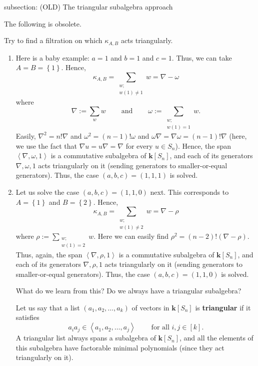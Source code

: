 \documentclass[numbers=enddot,12pt,final,onecolumn,notitlepage]{scrartcl}%
\numberwithin{exer}{subsection}
\theoremstyle{definition}
\let\sumnonlimits\sum
\renewcommand{\sum}{\sumnonlimits\limits}
\newenvironment{noncompile}{}{}
\begin{document}
\begin{noncompile}
subsection: (OLD) The triangular subalgebra approach

The following is obsolete.

Try to find a filtration on which $\kappa_{A,B}$ acts triangularly.

\begin{enumerate}
\item Here is a baby example: $a=1$ and $b=1$ and $c=1$. Thus, we can take
$A=B=\left\{  1\right\}  $. Hence,
\[
\kappa_{A,B}=\sum_{\substack{w;\\w\left(  1\right)  \neq1}}w=\nabla-\omega
\]
where%
\[
\nabla:=\sum_{w}w\ \ \ \ \ \ \ \ \ \ \text{and}\ \ \ \ \ \ \ \ \ \ \omega
:=\sum_{\substack{w;\\w\left(  1\right)  =1}}w.
\]
Easily, $\nabla^{2}=n!\nabla$ and $\omega^{2}=\left(  n-1\right)  !\omega$ and
$\omega\nabla=\nabla\omega=\left(  n-1\right)  !\nabla$ (here, we use the fact
that $\nabla u=u\nabla=\nabla$ for every $u\in S_{n}$). Hence, the span
$\left\langle \nabla,\omega,1\right\rangle $ is a commutative subalgebra of
$\mathbf{k}\left[  S_{n}\right]  $, and each of its generators $\nabla
,\omega,1$ acts triangularly on it (sending generators to smaller-or-equal
generators). Thus, the case $\left(  a,b,c\right)  =\left(  1,1,1\right)  $ is solved.

\item Let us solve the case $\left(  a,b,c\right)  =\left(  1,1,0\right)  $
next. This corresponds to $A=\left\{  1\right\}  $ and $B=\left\{  2\right\}
$. Hence,%
\[
\kappa_{A,B}=\sum_{\substack{w;\\w\left(  1\right)  \neq2}}w=\nabla-\rho
\]
where $\rho:=\sum_{\substack{w;\\w\left(  1\right)  =2}}w$. Here we can easily
find $\rho^{2}=\left(  n-2\right)  !\left(  \nabla-\rho\right)  $. Thus,
again, the span $\left\langle \nabla,\rho,1\right\rangle $ is a commutative
subalgebra of $\mathbf{k}\left[  S_{n}\right]  $, and each of its generators
$\nabla,\rho,1$ acts triangularly on it (sending generators to
smaller-or-equal generators). Thus, the case $\left(  a,b,c\right)  =\left(
1,1,0\right)  $ is solved.

What do we learn from this? Do we always have a triangular subalgebra?

Let us say that a list $\left(  a_{1},a_{2},\ldots,a_{k}\right)  $ of vectors
in $\mathbf{k}\left[  S_{n}\right]  $ is \textbf{triangular} if it satisfies
\[
a_{i}a_{j}\in\left\langle a_{1},a_{2},\ldots,a_{j}\right\rangle
\ \ \ \ \ \ \ \ \ \ \text{for all }i,j\in\left[  k\right]  .
\]
A triangular list always spans a subalgebra of $\mathbf{k}\left[
S_{n}\right]  $, and all the elements of this subalgebra have factorable
minimal polynomials (since they act triangularly on it).


\end{enumerate}
\end{noncompile}
\end{document}
